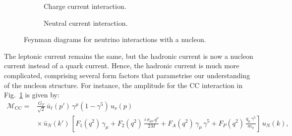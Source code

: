 \begin{figure}[h]
  \centering
  \begin{subfigure}[b]{0.45\textwidth}
    \centering
    \caption{Charge current interaction.}
    \label{fig:cc-interaction-n}
  \end{subfigure}
  \hfill
  \begin{subfigure}[b]{0.45\textwidth}
    \centering
    \caption{Neutral current interaction.}
    \label{fig:nc-interaction-n}
  \end{subfigure}
  \caption{Feynman diagrams for neutrino interactions with a nucleon.}
  \label{fig:nu-n-feyn}
\end{figure}
The leptonic current remains the same, but the hadronic current is now a nucleon current instead of a quark current.
Hence, the hadronic current is much more complicated, comprising several form factors that parametrise our understanding of the nucleon structure.
For instance, the amplitude for the CC interaction in Fig.~\ref{fig:cc-interaction-n} is given by:
\begin{align}
  \mathcal{M}_{\text{CC}} =& \frac{G_F}{\sqrt{2}} \,\bar{u}_\ell(p')\,\gamma^\mu (1 - \gamma^5)\,u_\nu(p) \\
   &\times \,\bar{u}_N(k')\,\left[ F_1(q^2)\,\gamma_\mu + F_2(q^2)\,\frac{i\,\sigma_{\mu\nu}\,q^\nu}{2M} + F_A(q^2)\,\gamma_\mu\,\gamma^5 + F_P(q^2)\,\frac{q_\mu\,\gamma^5}{m_\pi} \right]\,u_N(k),
\end{align}
